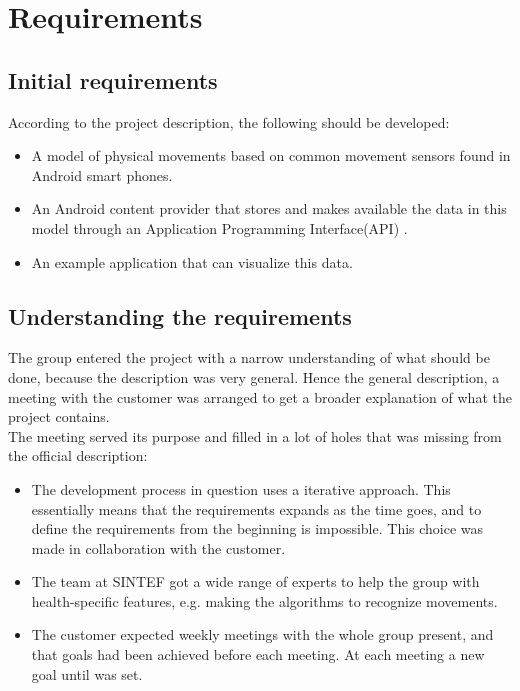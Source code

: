 \chapter{Requirements}


\section{Initial requirements}

According to the project description, the following should be developed:
\begin{itemize}
\item A model of physical movements based on common movement sensors found in Android smart phones.
\item An Android content provider that stores and makes available the data in this model through an Application Programming Interface(API) .
\item An example application that can visualize this data.
\end{itemize}

\section{Understanding the requirements}

The group entered the project with a narrow understanding of what should be done, because the description was very general. Hence the general description, a meeting with the customer was arranged to get a broader explanation of what the project contains.\\
The meeting served its purpose and filled in a lot of holes that was missing from the official description:
\begin{itemize}
\item The development process in question uses a iterative approach. This essentially means that the requirements expands as the time goes, and to define the requirements from the beginning is impossible. This choice was made in collaboration with the customer.
\item The team at SINTEF got a wide range of experts to help the group with health-specific features, e.g. making the algorithms to recognize movements.
\item The customer expected weekly meetings with the whole group present, and that goals had been achieved before each meeting. At each meeting a new goal until was set.
\end{itemize}